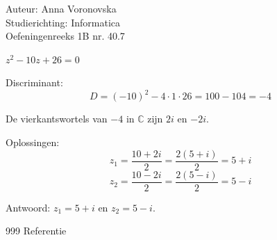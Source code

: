 \documentclass[a4paper]{article}
\begin{document}
\noindent \large Auteur: Anna Voronovska \\
\noindent \large Studierichting: Informatica \\
\noindent \large Oefeningenreeks 1B nr. 40.7 \\

\bigskip %

\normalsize
$z^2 - 10z + 26 = 0$


Discriminant:
\[
    D = (-10)^2 - 4 \cdot 1 \cdot 26 = 100 - 104 = -4
\]

De vierkantswortels van \(-4\) in $\mathbb{C}$ zijn \( 2i \) en \( -2i \).

Oplossingen:
\[
    z_1 = \frac{10 + 2i}{2} = \frac{2(5 + i)}{2} = 5 + i
\]
\[
    z_2 = \frac{10 - 2i}{2} = \frac{2(5 - i)}{2} = 5 - i
\]

Antwoord: \( z_1 = 5 + i \) en \( z_2 = 5 - i \).

\bigskip

\begin{thebibliography}{999}
 Referentie
\end{thebibliography}
\end{document}
